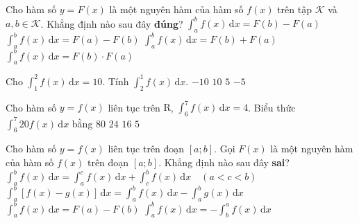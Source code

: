 \begin{ex}%
	Cho hàm số $y=F(x)$  là một nguyên hàm của hàm số $f(x)$ trên tập $\mathscr{K}$ và $a,b\in \mathscr{K}$. Khẳng định nào sau đây \textbf{đúng}?
	 \choice
		{\True  $ \displaystyle\int_{a}^{b}f(x)\mathrm{\,d}x=F(b)-F(a)$}
		{$ \displaystyle\int_{a}^{b}f(x)\mathrm{\,d}x=F(a)-F(b)$} 
		{$  \displaystyle\int_{a}^{b}f(x)\mathrm{\,d}x=F(b)+F(a)$}
		 {$ \displaystyle\int_{a}^{b}f(x)\mathrm{\,d}x=F(b)\cdot F(a)$}
\end{ex}

\begin{ex}%
	 Cho $\displaystyle\int_1^2f(x)\mathrm{\,d}x=10$. Tính $\displaystyle\int_2^1f(x)\mathrm{\,d}x$.
	\choice 
		{\True  $-10$}
		 {$10$}
		 {$5$}
		{$-5$} 
\end{ex}

\begin{ex}%
	Cho hàm số $y=f(x)$  liên tục trên $\mathrm{R}$, $\displaystyle\int_6^7 f(x)\mathrm{\,d}x =4$. Biểu thức $\displaystyle\int_6^7 20f(x)\mathrm{\,d}x$ bằng
	\choice 
		{\True  $80$}
		{$24$} 
		 {$16$}
		 {$5$}
\end{ex}

\begin{ex}%
	Cho hàm  số $y = f(x)$ liên tục trên đoạn $[a;b]$. Gọi $F(x)$ là một nguyên hàm của hàm số $f(x)$ trên đoạn $[a;b]$. Khẳng định nào sau đây \textbf{sai}?
	 \choice
		{$\displaystyle\int_a^b f(x) \mathrm{\,d}x = \int_a^c f(x) \mathrm{\,d}x + \int_c^b f(x) \mathrm{\,d}x \quad (a < c < b)$} 
		{$\displaystyle\int_a^b \left[f(x) - g(x) \right] \mathrm{\,d}x = \int_a^b f(x) \mathrm{\,d}x - \int_a^b g(x)  \mathrm{\,d}x$}
		 {\True $\displaystyle\int_a^b f(x) \mathrm{\,d}x = F(a) - F(b)$}
		{$\displaystyle\int_a^b f(x) \mathrm{\,d}x =  -\int_b^a f(x) \mathrm{\,d}x$}
\end{ex}

